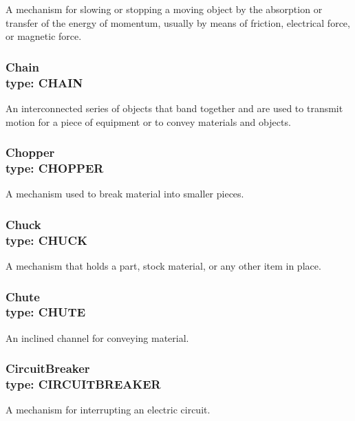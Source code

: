 A mechanism for slowing or stopping a moving object by the absorption or transfer of the energy of momentum, usually by means of friction, electrical force, or magnetic force.


\subsubsection[Chain]{Chain \\ {\small type: CHAIN}}
\label{sec:Chain}



An interconnected series of objects that band together and are used to transmit motion for a piece of equipment or to convey materials and objects.


\subsubsection[Chopper]{Chopper \\ {\small type: CHOPPER}}
\label{sec:Chopper}



A mechanism used to break material into smaller pieces.


\subsubsection[Chuck]{Chuck \\ {\small type: CHUCK}}




A mechanism that holds a part, stock material, or any other item in place.


\subsubsection[Chute]{Chute \\ {\small type: CHUTE}}
\label{sec:Chute}



An inclined channel for conveying material.


\subsubsection[CircuitBreaker]{CircuitBreaker \\ {\small type: CIRCUIT\textunderscore BREAKER}}
\label{sec:CircuitBreaker}



A mechanism for interrupting an electric circuit.


